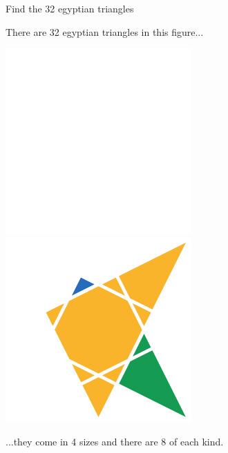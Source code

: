 \documentclass[14pt]{beamer}
\begin{document}

    \begin{frame}{Find the 32 egyptian triangles}
        \begin{center}
            There are 32 egyptian triangles in this figure...

            \bigskip \bigskip

            \includegraphics[height=18ex]{figures/figure002b.pdf}\qquad
            \includegraphics[height=18ex]{figures/figure002c.pdf}\\

            \bigskip \bigskip

            ...they come in 4 sizes and there are 8 of each kind.
        \end{center}
    \end{frame}

\end{document}
